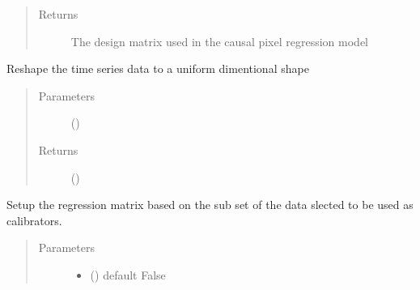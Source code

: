 \documentclass[a4paper,10pt,english]{sphinxmanual}
\begin{document}
\begin{fulllineitems}
\begin{fulllineitems}
\begin{quote}
\begin{description}
\begin{itemize}
\end{itemize}

\item[{Returns}] \leavevmode
{} \textendash{} The design matrix used in the causal pixel regression model

\end{description}\end{quote}

\end{fulllineitems}


\begin{fulllineitems}
\label{\detokenize{cascade.TSO:cascade.TSO.TSO.TSOSuite.reshape_data}}
Reshape the time series data to a uniform dimentional shape
\begin{quote}\begin{description}
\item[{Parameters}] \leavevmode
{} () \textendash{} 

\item[{Returns}] \leavevmode
{} ()

\end{description}\end{quote}

\end{fulllineitems}


\begin{fulllineitems}
\label{\detokenize{cascade.TSO:cascade.TSO.TSO.TSOSuite.return_all_design_matrices}}
Setup the regression matrix based on the sub set of the data slected
to be used as calibrators.
\begin{quote}\begin{description}
\item[{Parameters}] \leavevmode\begin{itemize}
\item {} 
 () \textendash{} default False


\end{itemize}
\end{description}
\end{quote}
\end{fulllineitems}
\end{fulllineitems}
\end{document}
